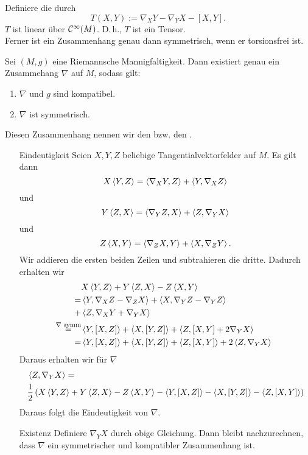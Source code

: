 \Bem{}
Definiere die  durch
\[ T(X,Y) := \nabla_{X}Y - \nabla_{Y}X - [X,Y]. \]
$T$ ist linear über $\mathcal{C}^{\infty}(M)$. D.\,h., $T$ ist ein Tensor.\\
Ferner ist ein Zusammenhang genau dann symmetrisch, wenn er torsionsfrei ist.

Sei $(M,g)$ eine Riemannsche Mannigfaltigkeit. Dann existiert genau ein Zusammehang $\nabla$ auf $M$, sodass gilt:
\begin{enumerate}[1.)]
	\item $\nabla$ und $g$ sind kompatibel.
	\item $\nabla$ ist symmetrisch.
\end{enumerate}
Diesen Zusammenhang nennen wir den  bzw. den .

\begin{Beweis}{}
\begin{enumerate}[option]
	\item[Eindeutigkeit] Seien $X,Y,Z$ beliebige Tangentialvektorfelder auf $M$. Es gilt dann
	\[ X\left<Y,Z\right> = \left<\nabla_{X}Y, Z\right> + \left<Y, \nabla_{X} Z\right> \]
	und
	\[ Y\left<Z,X\right> = \left< \nabla_{Y} Z, X \right> + \left<Z, \nabla_{Y} X\right> \]
	und
	\[ Z\left<X,Y\right> = \left<\nabla_{Z}X, Y\right> + \left<X, \nabla_Z Y\right>. \]
	Wir addieren die ersten beiden Zeilen und subtrahieren die dritte. Dadurch erhalten wir
	\begin{align*}
	&X\left<Y,Z\right> + Y\left<Z,X\right> - Z \left<X,Y\right> \\
	=&
	\left<Y, \nabla_XZ - \nabla_ZX\right> + \left< X, \nabla_YZ - \nabla_YZ \right>\\
	+& \left<Z, \nabla_XY + \nabla_YX\right>\\
	\overset{\nabla \text{ symm}}{=}& \left<Y, [X,Z]\right> + \left<X, [Y,Z]\right> + \left<Z, [X,Y] + 2 \nabla_YX\right>\\
	=&  \left<Y, [X,Z]\right> + \left<X, [Y,Z]\right> + \left<Z, [X,Y] \right>+ 2 \left<Z,\nabla_YX\right>\
	\end{align*}
	Daraus erhalten wir für $\nabla$
	\begin{align*}
	&\left<Z,\nabla_YX\right> =\\
	 &\frac{1}{2} \left(
		X\left<Y,Z\right> + Y\left<Z,X\right> - Z\left<X,Y\right> - \left<Y,[X,Z]\right> - \left<X, [Y,Z]\right> - \left<Z, [X,Y]\right>
	\right)
	\end{align*}
Daraus folgt die Eindeutigkeit von $\nabla$.
\item[Existenz] Definiere $\nabla_YX$ durch obige Gleichung. Dann bleibt nachzurechnen, dass $\nabla$ ein symmetrischer und kompatibler Zusammenhang ist.
\end{enumerate}

\end{Beweis}